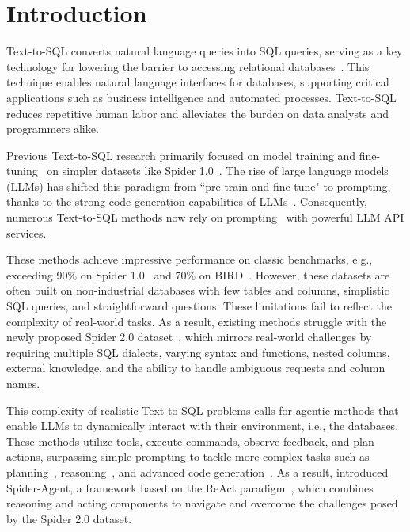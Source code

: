 \section{Introduction}

Text-to-SQL converts natural language queries into SQL queries, serving as a key technology for lowering the barrier to accessing relational databases~\citep{zelle1996learning,zettlemoyer2012learning,zhong2017seq2sql,yu2018spider,wang2019rat,gao2023text,lei2024spider}. This technique enables natural language interfaces for databases, supporting critical applications such as business intelligence and automated processes. Text-to-SQL reduces repetitive human labor and alleviates the burden on data analysts and programmers alike.

Previous Text-to-SQL research primarily focused on model training and fine-tuning~\citep{zhong2017seq2sql,wang2019rat,scholak2021picard} on simpler datasets like Spider 1.0~\citep{yu2018spider}. The rise of large language models (LLMs) has shifted this paradigm from ``pre-train and fine-tune" to prompting, thanks to the strong code generation capabilities of LLMs~\citep{anthropic2023claude3,roziere2023code,achiam2023gpt}. Consequently, numerous Text-to-SQL methods now rely on prompting~\citep{zhang2023act,gao2023text,pourreza2024din,talaei2024chess} with powerful LLM API services.

These methods achieve impressive performance on classic benchmarks, e.g., exceeding 90\% on Spider 1.0~\citep{yu2018spider} and 70\% on BIRD~\citep{li2024can}. However, these datasets are often built on non-industrial databases with few tables and columns, simplistic SQL queries, and straightforward questions. These limitations fail to reflect the complexity of real-world tasks. As a result, existing methods struggle with the newly proposed Spider 2.0 dataset~\citep{lei2024spider}, which mirrors real-world challenges by requiring multiple SQL dialects, varying syntax and functions, nested columns, external knowledge, and the ability to handle ambiguous requests and column names.

This complexity of realistic Text-to-SQL problems calls for agentic methods that enable LLMs to dynamically interact with their environment, i.e., the databases. These methods utilize tools, execute commands, observe feedback, and plan actions, surpassing simple prompting to tackle more complex tasks such as planning~\citep{wang2023plan,shinn2024reflexion}, reasoning~\citep{wei2022chain,besta2024graph,shao2024deepseekmath}, and advanced code generation~\citep{chen2023teaching,chen2024coder,yang2024intercode}. As a result, \citet{lei2024spider} introduced Spider-Agent, a framework based on the ReAct paradigm~\citep{yao2023react}, which combines reasoning and acting components to navigate and overcome the challenges posed by the Spider 2.0 dataset.

